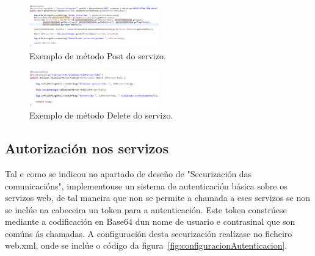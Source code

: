 \begin{figure}[tbh] 
	\begin{center}
		\includegraphics[width=0.5\textwidth]{figures/codigo/chamadaServizoPost}
		\caption{Exemplo de método Post do servizo.}
		\label{fig:chamadaServizoPost}
	\end{center}
\end{figure}

\begin{figure}[tbh] 
	\begin{center}
		\includegraphics[width=0.5\textwidth]{figures/codigo/chamadaServizoDelete}
		\caption{Exemplo de método Delete do servizo.}
		\label{fig:chamadaServizoDelete}
	\end{center}
\end{figure}







\subsection{Autorización nos servizos}
Tal e como se indicou no apartado de deseño de "Securización das comunicacións", implementouse un sistema de autenticación básica sobre os servizos web, de tal maneira que non se permite a chamada a eses servizos se non se inclúe na cabeceira un token para a autenticación. Este token constrúese mediante a codificación en Base64 dun nome de usuario e contrasinal que son comúns ás chamadas. A configuración desta securización realízase no ficheiro web.xml, onde se inclúe o código da figura~\ref{fig:configuracionAutenticacion}.


